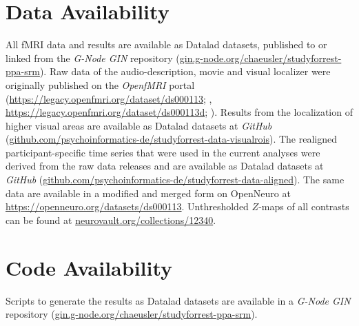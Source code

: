 \section{Data Availability}



All fMRI data and results are available as Datalad \citep{halchenko2021datalad}
datasets, published to or linked from the \emph{G-Node GIN} repository
(\href{https://gin.g-node.org/chaeusler/studyforrest-ppa-srm}{\url{gin.g-node.org/chaeusler/studyforrest-ppa-srm}}).
Raw data of the audio-description, movie and visual localizer were originally
published on the \emph{OpenfMRI} portal
(\url{https://legacy.openfmri.org/dataset/ds000113}; \citep{Hanke2014ds000113},
\space \url{https://legacy.openfmri.org/dataset/ds000113d};
\citep{hanke2016ds000113d}).
Results from the localization of higher visual areas are available as Datalad
datasets at \emph{GitHub}
(\href{https://github.com/psychoinformatics-de/studyforrest-data-visualrois}{\url{github.com/psychoinformatics-de/studyforrest-data-visualrois}}).
The realigned participant-specific time series that were used in the current
analyses were derived from the raw data releases and are available as Datalad
datasets at \emph{GitHub}
(\href{https://github.com/psychoinformatics-de/studyforrest-data-aligned}{\url{github.com/psychoinformatics-de/studyforrest-data-aligned}}).
The same data are available in a modified and merged form on OpenNeuro at
\url{https://openneuro.org/datasets/ds000113}.
Unthresholded $Z$-maps of all contrasts can be found at
\href{https://identifiers.org/neurovault.collection:12340}{\url{neurovault.org/collections/12340}}.


\section*{Code Availability}

Scripts to generate the results as Datalad \citep{halchenko2021datalad} datasets
are available in a \emph{G-Node GIN} repository
(\href{https://gin.g-node.org/chaeusler/studyforrest-ppa-srm}{\url{gin.g-node.org/chaeusler/studyforrest-ppa-srm}}).
